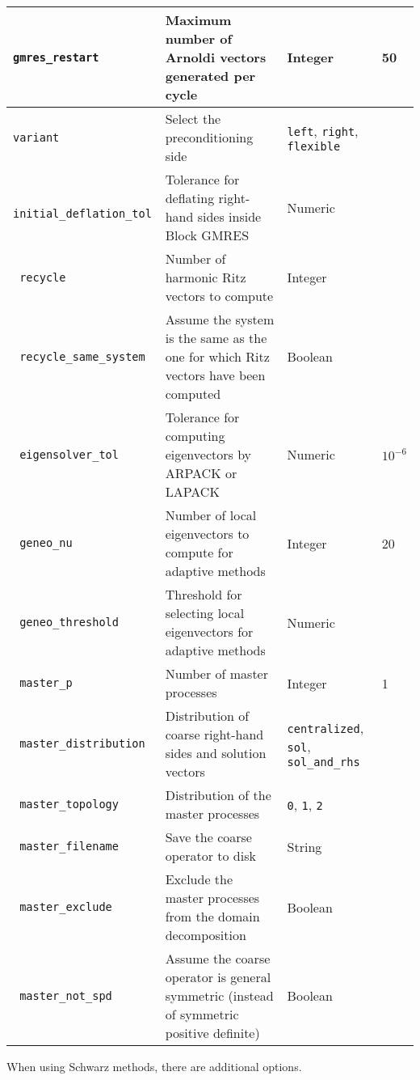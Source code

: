 \documentclass{article}
\begin{document}
\begin{center}
\begin{longtable}{| >{\tt}p{} | p{}| p{}| p{} |}
        gmres\_restart & Maximum number of Arnoldi vectors generated per cycle & Integer & 50 \\ \hline
        variant & Select the preconditioning side & \texttt{left}, \texttt{right}, \texttt{flexible} & \\ \hline
        initial\_deflation\_tol & Tolerance for deflating right-hand sides inside Block GMRES & Numeric & \\ \hline
        recycle & Number of harmonic Ritz vectors to compute & Integer & \\ \hline
        recycle\_same\_system & Assume the system is the same as the one for which Ritz vectors have been computed & Boolean & \\ \hline
        \rowcolor{LightRed}eigensolver\_tol & Tolerance for computing eigenvectors by ARPACK or LAPACK & Numeric & $10^{-6}$ \\ \hline
        geneo\_nu & Number of local eigenvectors to compute for adaptive methods & Integer & 20 \\ \hline
        \rowcolor{LightRed}geneo\_threshold & Threshold for selecting local eigenvectors for adaptive methods & Numeric & \\ \hline
        master\_p & Number of master processes & Integer & 1 \\ \hline
        \rowcolor{LightRed}master\_distribution & Distribution of coarse right-hand sides and solution vectors & \texttt{centralized}, \texttt{sol}, \texttt{sol\_and\_rhs} & \\ \hline
        \rowcolor{LightRed}master\_topology & Distribution of the master processes & \texttt{0}, \texttt{1}, \texttt{2} & \\ \hline
        master\_filename & Save the coarse operator to disk & String & \\ \hline
        \rowcolor{LightRed}master\_exclude & Exclude the master processes from the domain decomposition & Boolean & \\ \hline
        master\_not\_spd & Assume the coarse operator is general symmetric (instead of symmetric positive definite) & Boolean & \\ \hline
    \end{longtable}
\vspace*{-0.4cm}
\end{center}
When using Schwarz methods, there are additional options.
\vspace*{-0.4cm}
\end{document}
